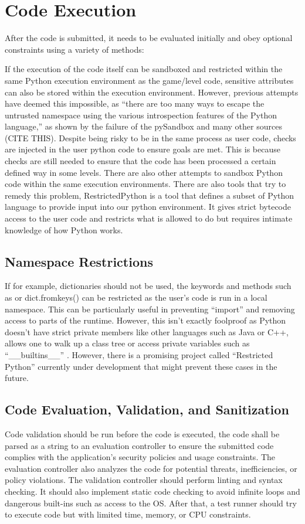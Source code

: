 \section{Code Execution}
After the code is submitted, it needs to be evaluated initially and obey optional constraints using a variety of methods:

If the execution of the code itself can be sandboxed and restricted within the same Python execution environment as the game/level code, sensitive attributes can also be stored within the execution environment. However, previous attempts have deemed this impossible, as “there are too many ways to escape the untrusted namespace using the various introspection features of the Python language,” as shown by the failure of the pySandbox and many other sources (CITE THIS). Despite being risky to be in the same process as user code, checks are injected in the user python code to ensure goals are met. This is because checks are still needed to ensure that the code has been processed a certain defined way in some levels. There are also other attempts to sandbox Python code within the same execution environments. There are also tools that try to remedy this problem, RestrictedPython is a tool that defines a subset of Python language to provide input into our python environment. It gives strict bytecode access to the user code and restricts what is allowed to do but requires intimate knowledge of how Python works. 


\subsection{Namespace Restrictions}
If for example, dictionaries should not be used, the keywords and methods such as {} or dict.fromkeys() can be restricted as the user’s code is run in a local namespace. This can be particularly useful in preventing “import” and removing access to parts of the runtime. 
However, this isn’t exactly foolproof as Python doesn't have strict private members like other languages such as Java or C++, allows one to walk up a class tree or access private variables such as “\_\_builtins\_\_” \cite{stackexchange_untrusted_python}. However, there is a promising project called “Restricted Python” \cite{restricted_python} currently under development that might prevent these cases in the future. 

\subsection{Code Evaluation, Validation, and Sanitization}
Code validation should be run before the code is executed, the code shall be parsed as a string to an evaluation controller to ensure the submitted code complies with the application's security policies and usage constraints. The evaluation controller also analyzes the code for potential threats, inefficiencies, or policy violations.
The validation controller should perform linting and syntax checking. It should also implement static code checking to avoid infinite loops and dangerous built-ins such as access to the OS. After that, a test runner should try to execute code but with limited time, memory, or CPU constraints.


